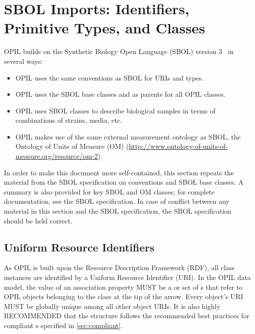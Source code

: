 \section{SBOL Imports: Identifiers, Primitive Types, and Classes}

OPIL builds on the Synthetic Biology Open Language (SBOL) version 3~\citep{SBOL3} in several ways:
\begin{itemize}
\item OPIL uses the same conventions as SBOL for URIs and types.
\item OPIL uses the SBOL base classes  and  as parents for all OPIL classes.
\item OPIL uses SBOL classes to describe biological samples in terms of combinations of strains, media, etc.
\item OPIL makes use of the same external measurement ontology as SBOL, the Ontology of Units of Measure (OM) (\url{http://www.ontology-of-units-of-measure.org/resource/om-2}).
\end{itemize}

In order to make this document more self-contained, this section repeats the material from the SBOL specification on conventions and SBOL base classes.
A summary is also provided for key SBOL and OM classes; for complete documentation, see the SBOL specification.
In case of conflict between any material in this section and the SBOL specification, the SBOL specification should be held correct.

\subsection{Uniform Resource Identifiers}
\label{sec:URIstructure}

As OPIL is built upon the Resource Description Framework (RDF), all class instances are identified by a Uniform Resource Identifier (URI).  In the OPIL data model, the value of an association property MUST be a  or set of s that refer to OPIL objects belonging to the class at the tip of the arrow.  Every  object's URI MUST be globally unique among all other  object URIs. It is also highly RECOMMENDED that the  structure follows the recommended best practices for compliant s specified in \ref{sec:compliant}.

